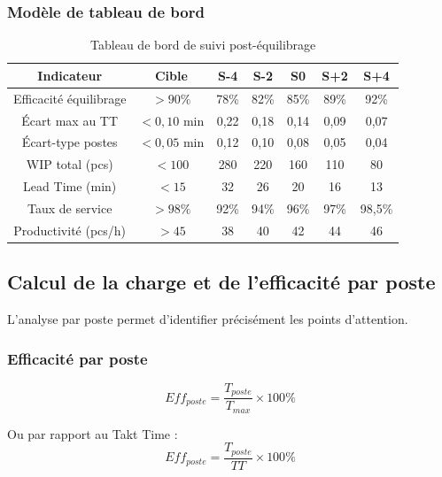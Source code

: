 \documentclass[12pt,a4paper]{article}
\begin{document}
\subsubsection{Modèle de tableau de bord}

\begin{table}[H]
\centering
\begin{tabular}{|c|c|c|c|c|c|c|}
\hline
\textbf{Indicateur} & \textbf{Cible} & \textbf{S-4} & \textbf{S-2} & \textbf{S0} & \textbf{S+2} & \textbf{S+4} \\
\hline
Efficacité équilibrage & $> 90\%$ & 78\% & 82\% & 85\% & 89\% & 92\% \\
\hline
Écart max au TT & $< 0,10$ min & 0,22 & 0,18 & 0,14 & 0,09 & 0,07 \\
\hline
Écart-type postes & $< 0,05$ min & 0,12 & 0,10 & 0,08 & 0,05 & 0,04 \\
\hline
WIP total (pcs) & $< 100$ & 280 & 220 & 160 & 110 & 80 \\
\hline
Lead Time (min) & $< 15$ & 32 & 26 & 20 & 16 & 13 \\
\hline
Taux de service & $> 98\%$ & 92\% & 94\% & 96\% & 97\% & 98,5\% \\
\hline
Productivité (pcs/h) & $> 45$ & 38 & 40 & 42 & 44 & 46 \\
\hline
\end{tabular}
\caption{Tableau de bord de suivi post-équilibrage}
\end{table}

\subsection{Calcul de la charge et de l'efficacité par poste}

L'analyse par poste permet d'identifier précisément les points d'attention.

\subsubsection{Efficacité par poste}

\[
\boxed{Eff_{poste} = \frac{T_{poste}}{T_{max}} \times 100\%}
\]

Ou par rapport au Takt Time :
\[
\boxed{Eff_{poste} = \frac{T_{poste}}{TT} \times 100\%}
\]

\begin{center}
\end{center}
\end{document}
